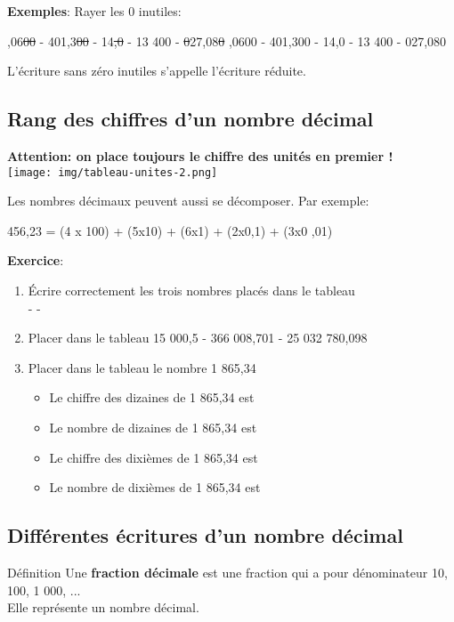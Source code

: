\documentclass[12pt,a4paper]{article}
\begin{document}
\textbf{Exemples}: Rayer les 0 inutiles:
\begin{center}
\ifdefined{},06\st{00} - 401,3\st{00} - 14\st{,0} - 13 400 - \st{0}27,08\st{0}
,0600 - 401,300 - 14,0 - 13 400 - 027,080
\fi
\end{center}
L'écriture sans zéro inutiles s'appelle l'écriture réduite.

\subsection{Rang des chiffres d'un nombre décimal}
\textbf{Attention: on place toujours le chiffre des unités en premier !}\\
\texttt{[image: img/tableau-unites-2.png]} 

Les nombres décimaux peuvent aussi se décomposer. Par exemple:
\begin{center}
456,23 = (4 x 100) + (5x10) + (6x1) + (2x0,1) + (3x0 ,01)
\end{center}
\textbf{Exercice}:
\begin{enumerate}[label=\textbf{\alph*.}]
\item Écrire correctement les trois nombres placés dans le tableau\\
 -  - 
\item Placer dans le tableau 15 000,5 - 366 008,701 - 25 032 780,098
\item Placer dans le tableau le nombre 1 865,34
\begin{itemize}
\item Le chiffre des dizaines de 1 865,34 est 
\item Le nombre de dizaines de 1 865,34 est 
\item Le chiffre des dixièmes de 1 865,34 est 
\item Le nombre de dixièmes de 1 865,34 est 
\end{itemize}
\end{enumerate}

\subsection{Différentes écritures d'un nombre décimal}

\begin{definition}{Définition}
Une \textbf{fraction décimale} est une fraction qui a pour dénominateur 10, 100, 1 000, ...\\
Elle représente un nombre décimal.
\end{definition}
\end{document}
